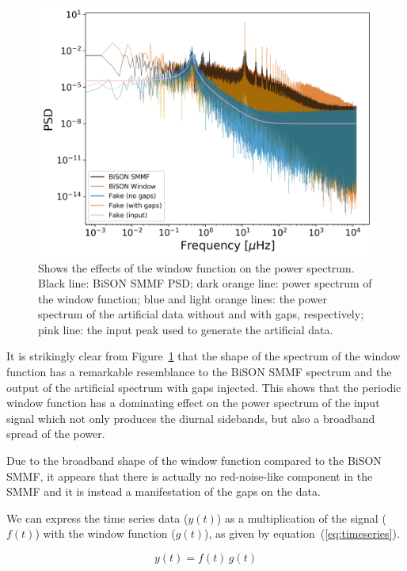 \begin{figure}[ht!]
	\centering
	\includegraphics[width=\columnwidth]{gap_test.png}
	\caption{Shows the effects of the window function on the power spectrum. Black line: BiSON SMMF PSD; dark orange line: power spectrum of the window function; blue and light orange lines: the power spectrum of the artificial data without and with gaps, respectively; pink line: the input peak used to generate the artificial data.}
	\label{fig:window_function_PSDs}
\end{figure}

It is strikingly clear from Figure~\ref{fig:window_function_PSDs} that the shape of the spectrum of the window function has a remarkable resemblance to the BiSON SMMF spectrum and the output of the artificial spectrum with gaps injected. This shows that the periodic window function has a dominating effect on the power spectrum of the input signal which not only produces the diurnal sidebands, but also a broadband spread of the power.

Due to the broadband shape of the window function compared to the BiSON SMMF, it appears that there is actually no red-noise-like component in the SMMF and it is instead a manifestation of the gaps on the data.

We can express the  time series data ($y(t)$) as a multiplication of the signal ($f(t)$) with the window function ($g(t)$), as given by equation~(\ref{eq:timeseries}).

\begin{equation}
y(t)  = f(t) \, g(t)
\label{eq:timeseries}
\end{equation}

